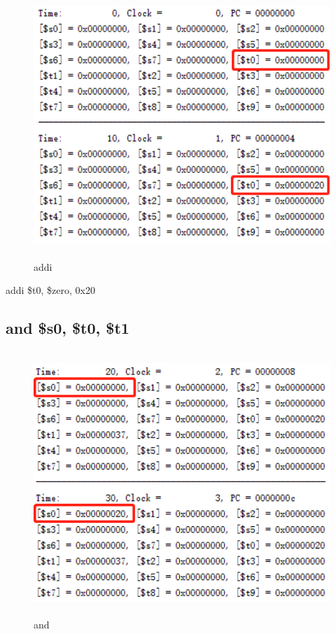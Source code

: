 \documentclass{article}
\begin{document}
\begin{figure}[H]
    \centering
    \includegraphics[height = 10cm,width = 13cm]{addi.png}
    \caption{addi}
    \label{fig:my_label}
\end{figure}

addi \$t0, \$zero, 0x20 \\

\subsection{and \$s0, \$t0, \$t1}

\begin{figure}[H]
    \centering
    \includegraphics[height = 10cm,width = 13cm]{and.png}
    \caption{and}
    \label{fig:my_label}
\end{figure}
\end{document}
